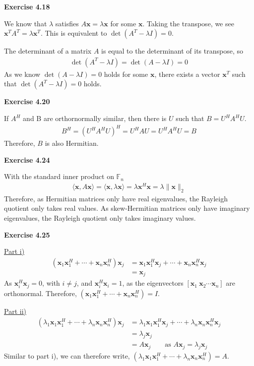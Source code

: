 \documentclass[letterpaper,12pt]{article}
\newcommand{\vect}[1]{\mathbf{#1}}
\begin{document}
\textbf{Exercise 4.18}

We know that $\lambda$ satisfies $A\vect{x} = \lambda \vect{x}$ for some $\vect{x}$. Taking the transpose, we see $\vect{x}^TA^T = \lambda \vect{x}^T$. This is equivalent to $\det(A^T - \lambda I) = 0$.

The determinant of a matrix $A$ is equal to the determinant of its transpose, so
\begin{align*}
\det(A^T - \lambda I) = \det(A - \lambda I) = 0
\end{align*}
As we know $\det(A - \lambda I) = 0$ holds for some $\vect{x}$, there exists a vector $\vect{x}^T$ such that $\det(A^T - \lambda I) = 0$ holds.

\textbf{Exercise 4.20}

If $A^H$ and B are orthornormally similar, then there is $U$ such that $B = U^HA^HU$.
\begin{align*}
B^H = (U^HA^HU)^H = U^H A U = U^H A^H U = B
\end{align*}
Therefore, $B$ is also Hermitian.

\textbf{Exercise 4.24}

With the standard inner product on $\mathbb F_n$
\begin{align*}
\langle \vect{x}, A \vect{x} \rangle = \langle \vect{x}, \lambda \vect{x} \rangle = \lambda \vect{x}^H \vect{x} = \lambda \|\vect{x}\|_2
\end{align*}
Therefore, as Hermitian matrices only have real eigenvalues, the Rayleigh quotient only takes real values. As skew-Hermitian matrices only have imaginary eigenvalues, the Rayleigh quotient only takes imaginary values.

\textbf{Exercise 4.25}

\underline{Part i)}
\begin{align*}
(\vect{x}_1\vect{x}_1^H + \cdots + \vect{x}_n\vect{x}_n^H) \vect{x}_j &=
\vect{x}_1\vect{x}_1^H\vect{x}_j + \cdots + \vect{x}_n\vect{x}^H_n\vect{x}_j\\ &=
\vect{x}_j
\end{align*}
As $\vect{x}^H_i \vect{x}_j = 0$, with $i \neq j$, and $\vect{x}^H_i \vect{x}_i = 1$, as the eigenvectors $[\vect{x}_1 \ \vect{x}_2 \cdots \vect{x}_n]$ are orthonormal. Therefore, $(\vect{x}_1\vect{x}_1^H + \cdots + \vect{x}_n\vect{x}_n^H) = I$.

\underline{Part ii)}
\begin{align*}
(\lambda_1 \vect{x}_1\vect{x}_1^H + \cdots + \lambda_n \vect{x}_n\vect{x}_n^H) \vect{x}_j &=
\lambda_1 \vect{x}_1\vect{x}_1^H\vect{x}_j + \cdots + \lambda_n \vect{x}_n\vect{x}^H_n\vect{x}_j\\ &=
\lambda_j \vect{x}_j \\ &=
A \vect{x}_j \quad \quad \text{as } A\vect{x}_j = \lambda_j \vect{x}_j
\end{align*}
Similar to part i), we can therefore write, $(\lambda_1 \vect{x}_1\vect{x}_1^H + \cdots + \lambda_n \vect{x}_n\vect{x}_n^H) = A$.
\end{document}

